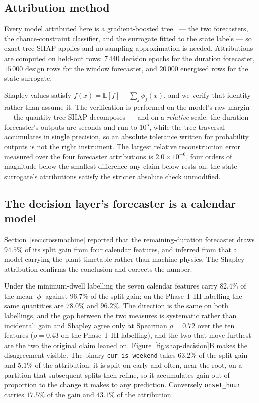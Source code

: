 \subsection{Attribution method}
\label{sec:explain:method}

Every model attributed here is a gradient-boosted
tree~\cite{chen2016xgboost} --- the two forecasters, the chance-constraint
classifier, and the surrogate fitted to the state labels --- so exact tree SHAP
applies and no sampling approximation is needed. Attributions are
computed on held-out rows: $7\,440$ decision epochs for the duration
forecaster, $15\,000$ design rows for the window forecaster, and $20\,000$
energised rows for the state surrogate.

Shapley values satisfy $f(x)=\mathbb{E}[f]+\sum_j\phi_j(x)$, and we verify that
identity rather than assume it. The verification is performed on the model's
raw margin --- the quantity tree SHAP decomposes --- and on a \emph{relative}
scale: the duration forecaster's outputs are seconds and run to $10^{5}$,
while the tree traversal accumulates in single precision, so an absolute
tolerance written for probability outputs is not the right instrument. The
largest relative reconstruction error measured over the four forecaster
attributions is $2.0\times10^{-6}$, four orders of magnitude below the
smallest difference any claim below rests on; the state surrogate's
attributions satisfy the stricter absolute check unmodified.

\subsection{The decision layer's forecaster is a calendar model}
\label{sec:explain:decision}

Section~\ref{sec:crossmachine} reported that the remaining-duration forecaster
draws $94.5\%$ of its split gain from four calendar features, and inferred
from that a model carrying the plant timetable rather than machine physics.
The Shapley attribution confirms the conclusion and corrects the number.

Under the minimum-dwell labelling the seven calendar features carry $82.4\%$
of the mean $|\phi|$ against $96.7\%$ of the split gain; on the
Phase~I--III labelling the same quantities are $78.0\%$ and $96.2\%$. The
direction is the same on both labellings, and the gap between the two measures
is systematic rather than incidental: gain and Shapley agree only at
Spearman $\rho=0.72$ over the ten features ($\rho=0.43$ on the Phase~I--III
labelling), and the two that move furthest are the two the original claim
leaned on.
Figure~\ref{fig:shap-decision}B makes the disagreement visible. The binary
\texttt{cur\_is\_weekend} takes $63.2\%$ of the split gain and $5.1\%$ of the
attribution: it is split on early and often, near the root, on a partition that
subsequent splits then refine, so it accumulates gain out of proportion to the
change it makes to any prediction. Conversely \texttt{onset\_hour} carries
$17.5\%$ of the gain and $43.1\%$ of the attribution.

